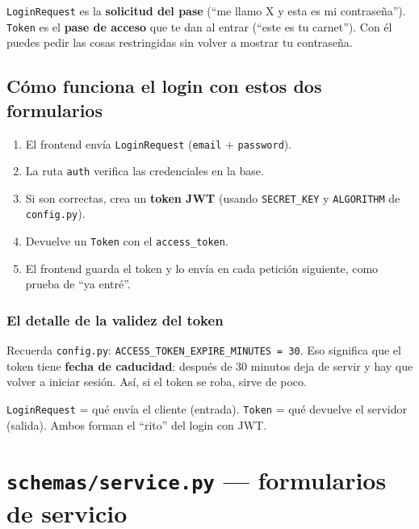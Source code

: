 \documentclass[11pt,a4paper]{article}
\begin{document}
\begin{analogia}
\texttt{LoginRequest} es la \textbf{solicitud del pase} (``me llamo X y esta es mi contraseña'').
\texttt{Token} es el \textbf{pase de acceso} que te dan al entrar (``este es tu carnet'').
Con él puedes pedir las cosas restringidas sin volver a mostrar tu contraseña.
\end{analogia}

\subsection{Cómo funciona el login con estos dos formularios}

\begin{enumerate}
    \item El frontend envía \texttt{LoginRequest} (\texttt{email} + \texttt{password}).
    \item La ruta \texttt{auth} verifica las credenciales en la base.
    \item Si son correctas, crea un \textbf{token JWT} (usando \texttt{SECRET\_KEY} y
    \texttt{ALGORITHM} de \texttt{config.py}).
    \item Devuelve un \texttt{Token} con el \texttt{access\_token}.
    \item El frontend guarda el token y lo envía en cada petición siguiente, como prueba de ``ya entré''.
\end{enumerate}

\subsubsection{El detalle de la validez del token}

Recuerda \texttt{config.py}: \texttt{ACCESS\_TOKEN\_EXPIRE\_MINUTES = 30}. Eso significa que el
token tiene \textbf{fecha de caducidad}: después de 30 minutos deja de servir y hay que volver
a iniciar sesión. Así, si el token se roba, sirve de poco.

\begin{recuadro}
\texttt{LoginRequest} = qué envía el cliente (entrada). \texttt{Token} = qué devuelve el
servidor (salida). Ambos forman el ``rito'' del login con JWT.
\end{recuadro}

\section{\texttt{schemas/service.py} --- formularios de servicio}
\end{document}
